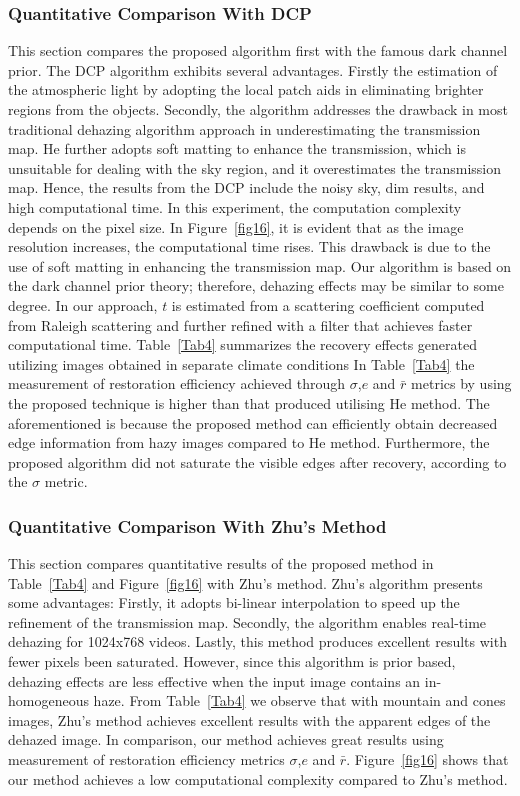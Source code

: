 \documentclass[doctor,english,listoffigures,listoftables]{thesis-uestc}
\begin{document}
\subsubsection{Quantitative Comparison With DCP\cite{a33}}
This section compares the proposed algorithm first with the famous dark channel prior. The DCP\cite{a33} algorithm exhibits several advantages. Firstly the estimation of the atmospheric light by adopting the local patch aids in eliminating brighter regions from the objects. Secondly, the algorithm addresses the drawback in most traditional dehazing algorithm approach in underestimating the transmission map. He further adopts soft matting to enhance the transmission, which is unsuitable for dealing with the sky region, and it overestimates the transmission map. Hence, the results from the DCP include the noisy sky,  dim results, and high computational time. In this experiment, the computation complexity depends on the pixel size. In Figure~\ref{fig16}, it is evident that as the image resolution increases, the computational time rises. This drawback is due to the use of soft matting in enhancing the transmission map. Our algorithm is based on the dark channel prior theory; therefore, dehazing effects may be similar to some degree. In our approach, $t$ is estimated from a scattering coefficient computed from Raleigh scattering and further refined with a filter that achieves faster computational time. Table~\ref{Tab4} summarizes the recovery effects generated utilizing images obtained in separate climate conditions
In Table~\ref{Tab4} the measurement of restoration efficiency achieved through $\sigma$,$ e$ and $\bar r$ metrics by using the proposed technique is higher than that produced utilising He method. The aforementioned is because the proposed method can efficiently obtain decreased edge information from hazy images compared to He method. Furthermore, the proposed algorithm did not saturate the visible edges after recovery, according to the $\sigma$ metric. 

\subsubsection{Quantitative Comparison With Zhu's\cite{a34} Method}
This section compares quantitative results of the proposed method in Table~\ref{Tab4}  and Figure~\ref{fig16} with Zhu's method. Zhu's algorithm presents some advantages: Firstly, it adopts bi-linear interpolation to speed up the refinement of the transmission map. Secondly, the algorithm enables real-time dehazing for 1024x768 videos. Lastly, this method produces excellent results with fewer pixels been saturated. 
However, since this algorithm is prior based, dehazing effects are less effective when the input image contains an in-homogeneous haze. From Table~\ref{Tab4} we observe that with mountain and cones images, Zhu's method achieves excellent results with the apparent edges of the dehazed image. In comparison, our method achieves great results using measurement of restoration efficiency metrics $\sigma$,$ e$ and $\bar r$. Figure~\ref{fig16} shows that our method achieves a low computational complexity compared to Zhu's method. 
\end{document}

